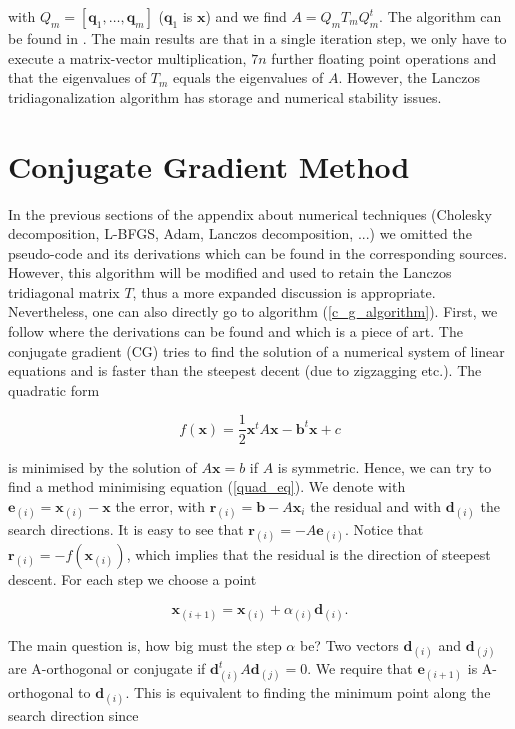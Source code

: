 \documentclass[12pt,a4paper,oneside]{book}
\begin{document}
{with $Q_m = [\bm{q}_1, \ldots, \bm{q}_m]$ ($\bm{q}_1$ is $\bm{x}$) and we find $A = Q_m T_m Q_m^t$. The algorithm can be found in \cite{arbenz2012lecture}.  The main results are that in a single iteration step, we only have to execute a matrix-vector multiplication, $7n$ further floating point operations and that the eigenvalues of $T_m$ equals the eigenvalues of $A$. However, the Lanczos tridiagonalization algorithm has storage and numerical stability issues. 


\section{Conjugate Gradient Method} \label{appendix_conj_grad}

In the previous sections of the appendix about numerical techniques (Cholesky decomposition, L-BFGS, Adam, Lanczos decomposition, ...) we omitted the pseudo-code and its derivations which can be found in the corresponding sources. However, this algorithm will be modified and used to retain the Lanczos tridiagonal matrix $T$, thus a more expanded discussion is appropriate. Nevertheless, one can also directly go to algorithm (\ref{c_g_algorithm}). First, we follow \cite{shewchuk1994introduction} where the derivations can be found and which is a piece of art. The conjugate gradient (CG) tries to find the solution of a numerical system of linear equations and is faster than the steepest decent (due to zigzagging etc.). The quadratic form 

\begin{equation}\label{quad_eq}
f(\bm{x}) = \dfrac{1}{2} \bm{x}^t A \bm{x} - \bm{b}^t \bm{x} + c
\end{equation}

is minimised by the solution of $A \bm{x} = b$ if $A$ is symmetric. Hence, we can try to find a method minimising equation (\ref{quad_eq}). We denote with $\bm{e}_{(i)} = \bm{x}_{(i)} - \bm{x}$ the error, with $\bm{r}_{(i)} = \bm{b} - A\bm{x}_i$ the residual and with $\bm{d}_{(i)}$ the search directions. It is easy to see that $\bm{r}_{(i)} = - A \bm{e}_{(i)}$. Notice that $\bm{r}_{(i)} = -f(\bm{x}_{(i)})$, which implies that the residual is the direction of steepest descent. For each step we choose a point

\begin{equation}
\bm{x}_{(i+1)} = \bm{x}_{(i)} + \alpha_{(i)} \bm{d}_{(i)}.
\end{equation}

The main question is, how big must the step $\alpha$ be?
Two vectors $\bm{d}_{(i)}$ and $\bm{d}_{(j)}$ are A-orthogonal or conjugate if $ \bm{d}_{(i)}^t A \bm{d}_{(j)} = 0$. We require that $\bm{e}_{(i+1)}$ is A-orthogonal to $\bm{d}_{(i)}$. This is equivalent to finding the minimum point along the search direction since

}
\end{document}
